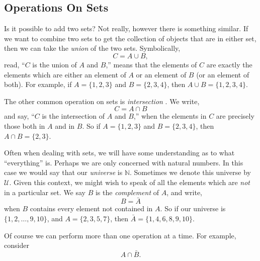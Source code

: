 \documentclass[10pt,]{book}
\theoremstyle{plain}
\theoremstyle{definition}
\theoremstyle{definition}
\theoremstyle{definition}
\def\N{\mathbb N}
\def\U{\mathcal U}
\begin{document}
\subsection[Operations On Sets]{Operations On Sets}\label{subsection-3}

      Is it possible to add two sets? Not really, however there is something similar. If we want to combine two sets to get the collection of objects that are in either set, then we can take the \emph{union}
       of the two sets. Symbolically,
      \begin{equation*}
        C = A \cup B,
      \end{equation*}
      read, ``\(C\) is the union of \(A\) and \(B\),'' means that the elements of \(C\) are exactly the elements which are either an element of \(A\) or an element of \(B\) (or an element of both). For example, if \(A = \{1, 2, 3\}\)      and \(B = \{2, 3, 4\}\), then \(A \cup B = \{1, 2, 3, 4\}\).
\par

      The other common operation on sets is \emph{intersection}
      . We write,
      \begin{equation*}
        C = A \cap B
      \end{equation*}
      and say, ``\(C\) is the intersection of \(A\) and \(B\),'' when the elements in \(C\) are precisely those both in \(A\) and in \(B\). So if \(A = \{1, 2, 3\}\) and \(B = \{2, 3, 4\}\), then \(A \cap B = \{2, 3\}\).
\par

      Often when dealing with sets, we will have some understanding as to what ``everything'' is. Perhaps we are only concerned with natural numbers. In this case we would say that our \emph{universe} is \(\N\). Sometimes we denote this universe
      by \(\U\). Given this context, we might wish to speak of all the elements which are \emph{not} in a particular set. We say \(B\) is the \emph{complement}
       of \(A\), and write,
      \begin{equation*}
        B = \bar A
      \end{equation*}
      when \(B\) contains every element not contained in \(A\). So if our universe is \(\{1, 2,\ldots, 9, 10\}\), and \(A = \{2, 3, 5, 7\}\), then \(\bar A = \{1, 4, 6, 8, 9,10\}\).
\par

      Of course we can perform more than one operation at a time. For example, consider
      \begin{equation*}
        A \cap \bar B.
      \end{equation*}
\par
\end{document}

